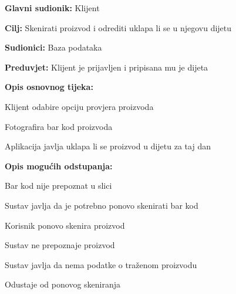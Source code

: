 					\noindent {}
					\begin{packed_item}
						
						\item \textbf{Glavni sudionik:} Klijent
						\item  \textbf{Cilj:} Skenirati proizvod i odrediti uklapa li se u njegovu dijetu
						\item  \textbf{Sudionici:} Baza podataka
						\item  \textbf{Preduvjet:} Klijent je prijavljen i pripisana mu je dijeta
						\item  \textbf{Opis osnovnog tijeka:}
						
						\item[] \begin{packed_enum}
							
							\item Klijent odabire opciju provjera proizvoda
							\item Fotografira bar kod proizvoda
							\item Aplikacija javlja uklapa li se proizvod u dijetu za taj dan
							
						\end{packed_enum}
						
						\item  \textbf{Opis mogućih odstupanja:}
						
						\item[] \begin{packed_item}
							
							\item[2.a] Bar kod nije prepoznat u slici
							\item[] \begin{packed_enum}
								
								\item Sustav javlja da je potrebno ponovo skenirati bar kod
								\item Korisnik ponovo skenira proizvod
							\end{packed_enum}
						
							\item[2.b] Sustav ne prepoznaje proizvod
							\item[] \begin{packed_enum}
								
								\item Sustav javlja da nema podatke o traženom proizvodu
								\item Odustaje od ponovog skeniranja
								
							\end{packed_enum}
							
						\end{packed_item}
						
					\end{packed_item}
				
